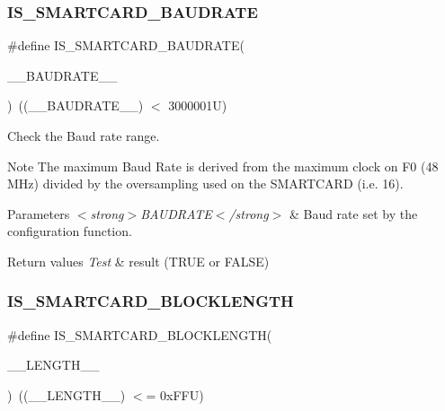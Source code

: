 \subsubsection{\texorpdfstring{I\+S\+\_\+\+S\+M\+A\+R\+T\+C\+A\+R\+D\+\_\+\+B\+A\+U\+D\+R\+A\+TE}{IS\_SMARTCARD\_BAUDRATE}}
{\footnotesize\ttfamily \#define I\+S\+\_\+\+S\+M\+A\+R\+T\+C\+A\+R\+D\+\_\+\+B\+A\+U\+D\+R\+A\+TE(\begin{DoxyParamCaption}\item[{}]{\+\_\+\+\_\+\+B\+A\+U\+D\+R\+A\+T\+E\+\_\+\+\_\+ }\end{DoxyParamCaption})~((\+\_\+\+\_\+\+B\+A\+U\+D\+R\+A\+T\+E\+\_\+\+\_\+) $<$ 3000001\+U)}



Check the Baud rate range. 

\begin{DoxyNote}{Note}
The maximum Baud Rate is derived from the maximum clock on F0 (48 M\+Hz) divided by the oversampling used on the S\+M\+A\+R\+T\+C\+A\+RD (i.\+e. 16). 
\end{DoxyNote}

\begin{DoxyParams}{Parameters}
{\em $<$strong$>$\+B\+A\+U\+D\+R\+A\+T\+E$<$/strong$>$} & Baud rate set by the configuration function. \\
\hline
\end{DoxyParams}

\begin{DoxyRetVals}{Return values}
{\em Test} & result (T\+R\+UE or F\+A\+L\+SE) \\
\hline
\end{DoxyRetVals}
\mbox{\label{group___s_m_a_r_t_c_a_r_d___private___macros_ga23ec81fa2d39464f2b0a45664cb82308}} 
\subsubsection{\texorpdfstring{I\+S\+\_\+\+S\+M\+A\+R\+T\+C\+A\+R\+D\+\_\+\+B\+L\+O\+C\+K\+L\+E\+N\+G\+TH}{IS\_SMARTCARD\_BLOCKLENGTH}}
{\footnotesize\ttfamily \#define I\+S\+\_\+\+S\+M\+A\+R\+T\+C\+A\+R\+D\+\_\+\+B\+L\+O\+C\+K\+L\+E\+N\+G\+TH(\begin{DoxyParamCaption}\item[{}]{\+\_\+\+\_\+\+L\+E\+N\+G\+T\+H\+\_\+\+\_\+ }\end{DoxyParamCaption})~((\+\_\+\+\_\+\+L\+E\+N\+G\+T\+H\+\_\+\+\_\+) $<$= 0x\+F\+F\+U)}




